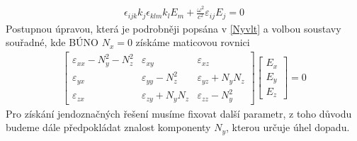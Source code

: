 \begin{eqnarray}
\epsilon_{ijk}k_j\epsilon_{klm}k_lE_m+\frac{\omega^2}{c^2}\varepsilon_{ij}E_j =0
\end{eqnarray}
Postupnou úpravou, která je podrobněji popsána v \ref{Nyvlt} a volbou soustavy souřadné, kde BÚNO $N_x=0$ získáme maticovou rovnici
\begin{eqnarray}
\begin{bmatrix}
\varepsilon_{xx}-N_y^2-N_z^2& \varepsilon_{xy}& \varepsilon_{xz} \\
\varepsilon_{yx}&   \varepsilon_{yy}-N_z^2& \varepsilon_{yz}+N_yN_z\\
\varepsilon_{zx}&   \varepsilon_{zy}+N_yN_z& \varepsilon_{zz}-N_y^2
\end{bmatrix}
\begin{bmatrix}
E_x\\ E_y\\ E_z
\end{bmatrix} = 0
\label{Matic1}
\end{eqnarray}
Pro získání jendoznačných řešení musíme fixovat další parametr, z toho důvodu budeme dále předpokládat znalost komponenty $N_y$, kterou určuje úhel dopadu. %

